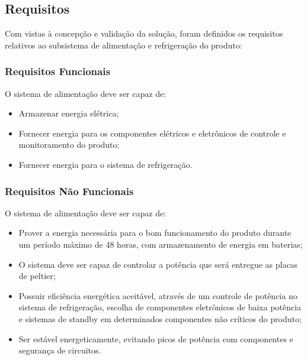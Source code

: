 \subsection{Requisitos}
Com vistas à concepção e validação da solução, foram definidos os requisitos relativos ao subsistema de alimentação e refrigeração do produto:

\subsubsection{Requisitos Funcionais}
O sistema de alimentação deve ser capaz de:
\begin{itemize}
\item Armazenar energia elétrica;
 \item Fornecer energia para os componentes elétricos e eletrônicos de controle e monitoramento do produto;
 \item Fornecer energia para o sistema de refrigeração.
 \end{itemize}
\subsubsection{Requisitos Não Funcionais}
O sistema de alimentação deve ser capaz de:
\begin{itemize}
\item Prover a energia necessária para o bom funcionamento do produto durante um período máximo de 48 horas, com armazenamento de energia em baterias;
\item O sistema deve ser capaz de controlar a potência que será entregue as placas de peltier;
 \item Possuir eficiência energética aceitável, através de um controle de potência no sistema de refrigeração, escolha de componentes eletrônicos de baixa potência e sistemas de standby em determinados componentes não críticos do produto;
 \item Ser estável energeticamente, evitando picos de potência com componentes e segurança de circuitos.
 \end{itemize}